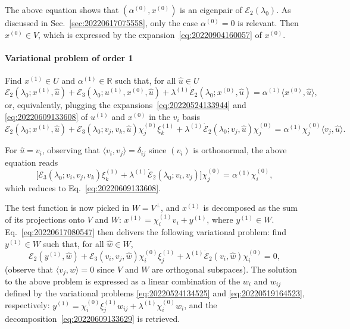 \documentclass[12pt, final]{scrartcl}
\theoremstyle{definition}
\newcommand{\E}{\mathcal E}
\newcommand{\order}[2][1]{#2^{(#1)}}
\newcommand{\reals}{\mathbb{R}}
\begin{document}
The above equation shows that $(\order[0]α, \order[0]x)$ is an eigenpair of $\E_2(\lambda_0)$. As
discussed in Sec.~\ref{sec:20220617075558}, only the case $\order[0]α = 0$ is
relevant. Then $\order[0]x \in V$, which is expressed by the
expansion~\eqref{eq:20220904160057} of $\order[0]x$.

\paragraph{Variational problem of order 1} Find $\order[1]x \in U$ and $\order[1]α\in\reals$ such
that, for all $\hat{u} \in U$
\begin{equation}
  \label{eq:20220609131953}
  \E_2(\lambda_0; \order[1]x, \hat{u}) + \E_3(\lambda_0; \order[1]u, \order[0]x, \hat{u}) + \order[1]\lambda \dot{\E}_2(\lambda_0; \order[0]x, \hat{u})
  = \order[1]α \langle \order[0]x, \hat{u} \rangle,
\end{equation}
or, equivalently, plugging the expansions~\eqref{eq:20220524133944} and
\eqref{eq:20220609133608} of $\order[1]u$ and $\order[0]x$ in the $v_i$ basis
\begin{equation}
  \label{eq:20220617080547}
  \E_2(\lambda_0; \order[1]x, \hat{u}) + \E_3(\lambda_0; v_j, v_k, \hat{u}) \order[0]{χ_j} \order[1]{\xi_k} + \order[1]\lambda \dot{\E}_2(\lambda_0; v_j, \hat{u}) \order[0]{χ_j}
  = \order[1]α \order[0]{χ_j} \langle v_j, \hat{u} \rangle.
\end{equation}

For $\hat{u} = v_i$, observing that $\langle v_i, v_j \rangle = δ_{ij}$ since
$(v_i)$ is orthonormal, the above equation reads
\begin{equation}
  \bigl[\E_3(\lambda_0; v_i, v_j, v_k) \order[1]{\xi_k} + \order[1]\lambda \dot{\E}_2(\lambda_0; v_i, v_j)\bigr] \order[0]{χ_j} = \order[1]α \order[0]{χ_i},
\end{equation}
which reduces to Eq.~\eqref{eq:20220609133608}.

The test function is now picked in $W = V^\perp$, and $\order[1]x$ is
decomposed as the sum of its projections onto $V$ and $W$:
$\order[1]x = \order[1]{χ_i} v_i + \order[1]{y}$, where $\order[1]y \in
W$. Eq.~\eqref{eq:20220617080547} then delivers the following variational
problem: find $\order[1]y \in W$ such that, for all $\hat{w} \in W$,
\begin{equation}
  \E_2(\order[1]y, \hat{w}) + \E_3(v_i, v_j, \hat{w}) \order[0]{χ_i} \order[1]{\xi_j} + \order[1]\lambda \dot{\E}_2(v_i, \hat{w}) \order[0]{χ_i} = 0,
\end{equation}
(observe that $\langle v_j, \hat{w} \rangle = 0$ since $V$ and $W$ are orthogonal
subspaces). The solution to the above problem is expressed as a linear
combination of the $w_i$ and $w_{ij}$ defined by the variational problems
\eqref{eq:20220524134525} and \eqref{eq:20220519164523}, respectively:
$\order[1]y = \order[0]{χ_i} \order[1]{\xi_j} w_{i j} + \order[1]\lambda \order[0]{χ_i}
w_i$, and the decomposition~\eqref{eq:20220609133629} is retrieved.
\end{document}
